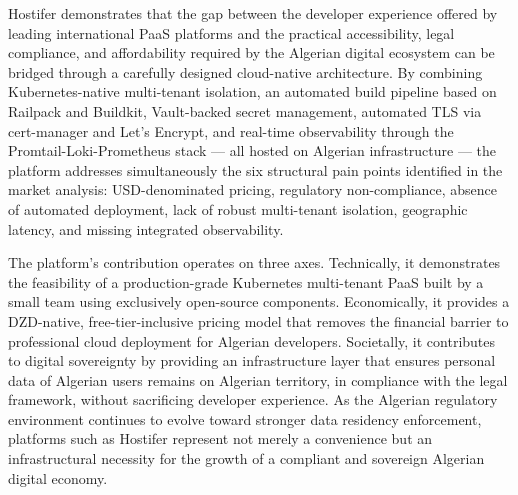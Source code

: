 Hostifer demonstrates that the gap between the developer experience offered by leading international PaaS platforms and the practical accessibility, legal compliance, and affordability required by the Algerian digital ecosystem can be bridged through a carefully designed cloud-native architecture. By combining Kubernetes-native multi-tenant isolation, an automated build pipeline based on Railpack and Buildkit, Vault-backed secret management, automated TLS via cert-manager and Let's Encrypt, and real-time observability through the Promtail-Loki-Prometheus stack — all hosted on Algerian infrastructure — the platform addresses simultaneously the six structural pain points identified in the market analysis: USD-denominated pricing, regulatory non-compliance, absence of automated deployment, lack of robust multi-tenant isolation, geographic latency, and missing integrated observability.

The platform's contribution operates on three axes. Technically, it demonstrates the feasibility of a production-grade Kubernetes multi-tenant PaaS built by a small team using exclusively open-source components. Economically, it provides a DZD-native, free-tier-inclusive pricing model that removes the financial barrier to professional cloud deployment for Algerian developers. Societally, it contributes to digital sovereignty by providing an infrastructure layer that ensures personal data of Algerian users remains on Algerian territory, in compliance with the legal framework, without sacrificing developer experience. As the Algerian regulatory environment continues to evolve toward stronger data residency enforcement, platforms such as Hostifer represent not merely a convenience but an infrastructural necessity for the growth of a compliant and sovereign Algerian digital economy.

